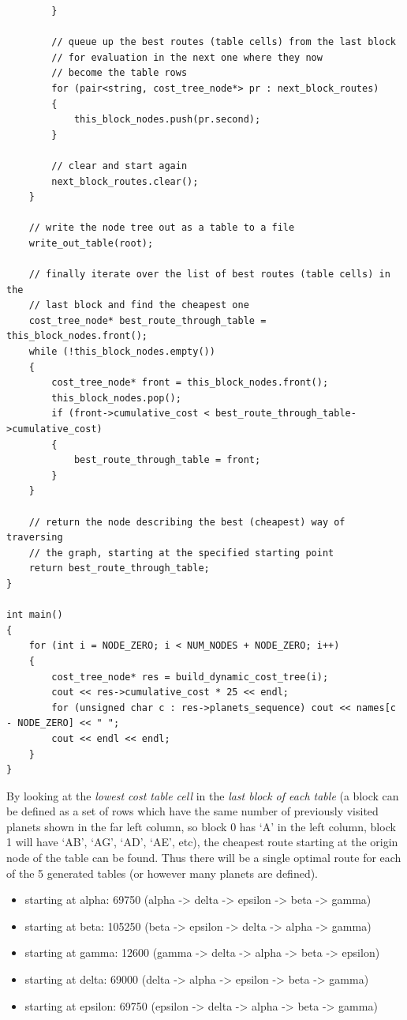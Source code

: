 \documentclass[
]{article}
\begin{document}
\begin{verbatim}
        }

        // queue up the best routes (table cells) from the last block
        // for evaluation in the next one where they now
        // become the table rows
        for (pair<string, cost_tree_node*> pr : next_block_routes)
        {
            this_block_nodes.push(pr.second);
        }

        // clear and start again
        next_block_routes.clear();
    }

    // write the node tree out as a table to a file
    write_out_table(root);

    // finally iterate over the list of best routes (table cells) in the 
    // last block and find the cheapest one
    cost_tree_node* best_route_through_table = this_block_nodes.front();
    while (!this_block_nodes.empty())
    {
        cost_tree_node* front = this_block_nodes.front();
        this_block_nodes.pop();
        if (front->cumulative_cost < best_route_through_table->cumulative_cost)
        {
            best_route_through_table = front;
        }
    }

    // return the node describing the best (cheapest) way of traversing 
    // the graph, starting at the specified starting point
    return best_route_through_table;
}

int main()
{
    for (int i = NODE_ZERO; i < NUM_NODES + NODE_ZERO; i++)
    {
        cost_tree_node* res = build_dynamic_cost_tree(i);
        cout << res->cumulative_cost * 25 << endl;
        for (unsigned char c : res->planets_sequence) cout << names[c - NODE_ZERO] << " ";
        cout << endl << endl;
    }
}
\end{verbatim}

By looking at the \emph{lowest cost table cell} in the \emph{last block
of each table} (a block can be defined as a set of rows which have the
same number of previously visited planets shown in the far left column,
so block 0 has `A' in the left column, block 1 will have `AB', `AG',
`AD', `AE', etc), the cheapest route starting at the origin node of the
table can be found. Thus there will be a single optimal route for each
of the 5 generated tables (or however many planets are defined).

\begin{itemize}
\item
  starting at alpha: 69750 (alpha -\textgreater{} delta -\textgreater{}
  epsilon -\textgreater{} beta -\textgreater{} gamma)
\item
  starting at beta: 105250 (beta -\textgreater{} epsilon -\textgreater{}
  delta -\textgreater{} alpha -\textgreater{} gamma)
\item
  starting at gamma: 12600 (gamma -\textgreater{} delta -\textgreater{}
  alpha -\textgreater{} beta -\textgreater{} epsilon)
\item
  starting at delta: 69000 (delta -\textgreater{} alpha -\textgreater{}
  epsilon -\textgreater{} beta -\textgreater{} gamma)
\item
  starting at epsilon: 69750 (epsilon -\textgreater{} delta
  -\textgreater{} alpha -\textgreater{} beta -\textgreater{} gamma)
\end{itemize}
\end{document}
